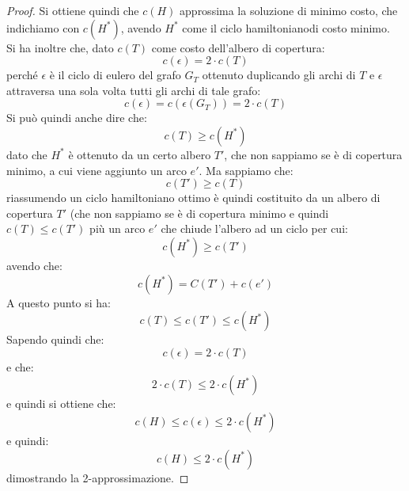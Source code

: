 \begin{proof}
  Si ottiene quindi che $c(H)$ approssima la soluzione di minimo costo, che
  indichiamo con $c(H^*)$, avendo $H^*$ come il ciclo hamiltonianodi costo
  minimo. \\
  Si ha inoltre che, dato $c(T)$ come costo dell'albero di copertura:
  \[c(\epsilon)=2\cdot c(T)\]
  perché $\epsilon$ è il ciclo di eulero del grafo $G_T$ ottenuto duplicando gli
  archi di $T$ e $\epsilon$ attraversa una sola volta tutti gli archi di tale
  grafo:
  \[c(\epsilon)=c(\epsilon(G_T))=2\cdot c(T)\]
  Si può quindi anche dire che:
  \[c(T)\geq c(H^*)\]
  dato che $H^*$ è ottenuto da un certo albero $T'$, che non sappiamo se è di
  copertura minimo, a cui viene aggiunto un arco $e'$.
  Ma sappiamo che:
  \[c(T')\geq c(T)\]
  riassumendo un ciclo hamiltoniano ottimo è quindi costituito da un albero di
  copertura $T'$ (che non sappiamo se è di copertura minimo e quindi $c(T)\leq
  c(T')$ più un arco $e'$ che chiude l'albero ad un ciclo per cui: 
  \[c(H^*)\geq c(T')\]
  avendo che:
  \[c(H^*)=C(T')+c(e')\]
  A questo punto si ha:
  \[c(T)\leq c(T')\leq c(H^*)\]
  Sapendo quindi che:
  \[c(\epsilon)=2\cdot c(T)\]
  e che:
  \[2\cdot c(T)\leq 2\cdot c(H^*)\]
  e quindi si ottiene che:
  \[c(H)\leq c(\epsilon)\leq 2\cdot c(H^*)\]
  e quindi:
  \[c(H)\leq 2\cdot c(H^*)\]
  dimostrando la 2-approssimazione.
\end{proof}

